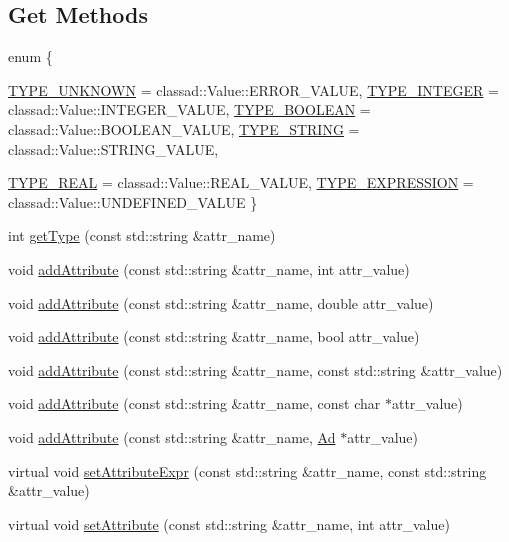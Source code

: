 \subsection*{Get Methods}
\begin{CompactItemize}
\item 
enum \{ \par
\hyperlink{classglite_1_1wms_1_1jdl_1_1Ad_z19_0w0}{TYPE\_\-UNKNOWN} =  classad::Value::ERROR\_\-VALUE, 
\hyperlink{classglite_1_1wms_1_1jdl_1_1Ad_z19_0w1}{TYPE\_\-INTEGER} = classad::Value::INTEGER\_\-VALUE, 
\hyperlink{classglite_1_1wms_1_1jdl_1_1Ad_z19_0w2}{TYPE\_\-BOOLEAN} = classad::Value::BOOLEAN\_\-VALUE, 
\hyperlink{classglite_1_1wms_1_1jdl_1_1Ad_z19_0w3}{TYPE\_\-STRING} = classad::Value::STRING\_\-VALUE, 
\par
\hyperlink{classglite_1_1wms_1_1jdl_1_1Ad_z19_0w4}{TYPE\_\-REAL} = classad::Value::REAL\_\-VALUE, 
\hyperlink{classglite_1_1wms_1_1jdl_1_1Ad_z19_0w5}{TYPE\_\-EXPRESSION} = classad::Value::UNDEFINED\_\-VALUE
 \}
\item 
int \hyperlink{classglite_1_1wms_1_1jdl_1_1Ad_z19_1}{get\-Type} (const std::string \&attr\_\-name)
\item 
void \hyperlink{classglite_1_1wms_1_1jdl_1_1Ad_z19_2}{add\-Attribute} (const std::string \&attr\_\-name, int attr\_\-value)
\item 
void \hyperlink{classglite_1_1wms_1_1jdl_1_1Ad_z19_3}{add\-Attribute} (const std::string \&attr\_\-name, double attr\_\-value)
\item 
void \hyperlink{classglite_1_1wms_1_1jdl_1_1Ad_z19_4}{add\-Attribute} (const std::string \&attr\_\-name, bool attr\_\-value)
\item 
void \hyperlink{classglite_1_1wms_1_1jdl_1_1Ad_z19_5}{add\-Attribute} (const std::string \&attr\_\-name, const std::string \&attr\_\-value)
\item 
void \hyperlink{classglite_1_1wms_1_1jdl_1_1Ad_z19_6}{add\-Attribute} (const std::string \&attr\_\-name, const char $\ast$attr\_\-value)
\item 
void \hyperlink{classglite_1_1wms_1_1jdl_1_1Ad_z19_7}{add\-Attribute} (const std::string \&attr\_\-name, \hyperlink{classglite_1_1wms_1_1jdl_1_1Ad}{Ad} $\ast$attr\_\-value)
\item 
virtual void \hyperlink{classglite_1_1wms_1_1jdl_1_1Ad_z19_8}{set\-Attribute\-Expr} (const std::string \&attr\_\-name, const std::string \&attr\_\-value)
\item 
virtual void \hyperlink{classglite_1_1wms_1_1jdl_1_1Ad_z19_9}{set\-Attribute} (const std::string \&attr\_\-name, int attr\_\-value)

\end{CompactItemize}
